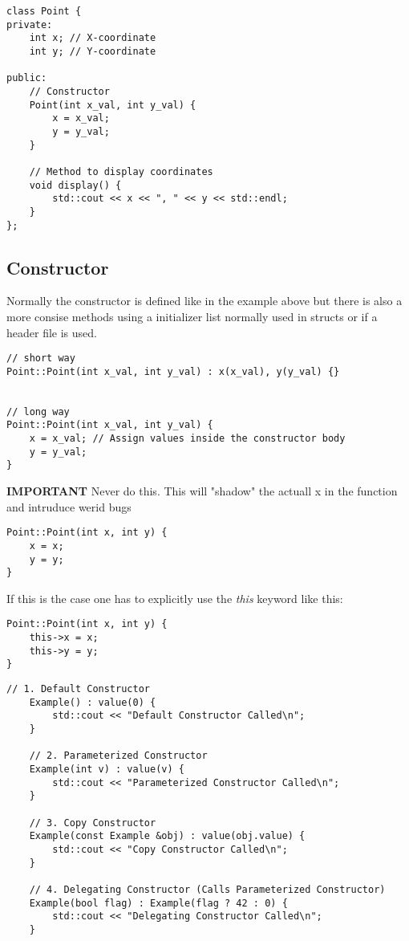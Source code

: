 \begin{lstlisting}[style=codeexpert]
class Point {
private:
    int x; // X-coordinate
    int y; // Y-coordinate

public:
    // Constructor
    Point(int x_val, int y_val) {
        x = x_val;
        y = y_val;
    }

    // Method to display coordinates
    void display() {
        std::cout << x << ", " << y << std::endl;
    }
};
\end{lstlisting}

\subsection{Constructor} 
Normally the constructor is defined like in the example above but there is also a more consise methods using a initializer list normally used in structs or if a header file is used.
\\
\begin{lstlisting}[style=codeexpert]
// short way
Point::Point(int x_val, int y_val) : x(x_val), y(y_val) {}


// long way
Point::Point(int x_val, int y_val) {
    x = x_val; // Assign values inside the constructor body
    y = y_val;
}

\end{lstlisting}

\textbf{IMPORTANT} Never do this. This will "shadow" the actuall x in the function and intruduce werid bugs
\begin{lstlisting}[style=codeexpert]
Point::Point(int x, int y) {
    x = x;
    y = y;
}
\end{lstlisting}

If this is the case one has to explicitly use the \textit{this} keyword like this:
\begin{lstlisting}[style=codeexpert]
Point::Point(int x, int y) {
    this->x = x;
    this->y = y;
}
\end{lstlisting}

\begin{lstlisting}[style=codeexpert]
    // 1. Default Constructor
    Example() : value(0) { 
        std::cout << "Default Constructor Called\n";
    }
    
    // 2. Parameterized Constructor
    Example(int v) : value(v) { 
        std::cout << "Parameterized Constructor Called\n";
    }
    
    // 3. Copy Constructor
    Example(const Example &obj) : value(obj.value) { 
        std::cout << "Copy Constructor Called\n";
    }
    
    // 4. Delegating Constructor (Calls Parameterized Constructor)
    Example(bool flag) : Example(flag ? 42 : 0) { 
        std::cout << "Delegating Constructor Called\n";
    }
\end{lstlisting}


